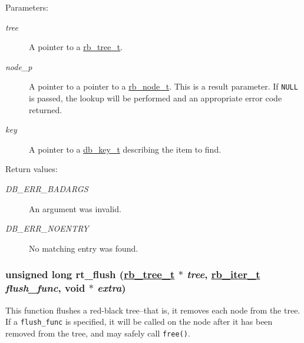 \begin{Desc}
\item[Parameters:]
\begin{description}
\item[{\em tree}]A pointer to a \hyperlink{group__dbprim__rbtree_a0}{rb\_\-tree\_\-t}. \item[{\em node\_\-p}]A pointer to a pointer to a \hyperlink{group__dbprim__rbtree_a1}{rb\_\-node\_\-t}. This is a result parameter. If {\tt NULL} is passed, the lookup will be performed and an appropriate error code returned. \item[{\em key}]A pointer to a \hyperlink{group__dbprim_a0}{db\_\-key\_\-t} describing the item to find.\end{description}
\end{Desc}
\begin{Desc}
\item[Return values:]
\begin{description}
\item[{\em DB\_\-ERR\_\-BADARGS}]An argument was invalid. \item[{\em DB\_\-ERR\_\-NOENTRY}]No matching entry was found. \end{description}
\end{Desc}
\hypertarget{group__dbprim__rbtree_a12}{
\subsubsection[rt\_\-flush]{\setlength{\rightskip}{0pt plus 5cm}unsigned long rt\_\-flush (\hyperlink{dbprim_8h_a0}{rb\_\-tree\_\-t} $\ast$ {\em tree}, \hyperlink{dbprim_8h_a2}{rb\_\-iter\_\-t} {\em flush\_\-func}, void $\ast$ {\em extra})}}
\label{group__dbprim__rbtree_a12}


This function flushes a red-black tree--that is, it removes each node from the tree. If a {\tt flush\_\-func} is specified, it will be called on the node after it has been removed from the tree, and may safely call {\tt free()}.

